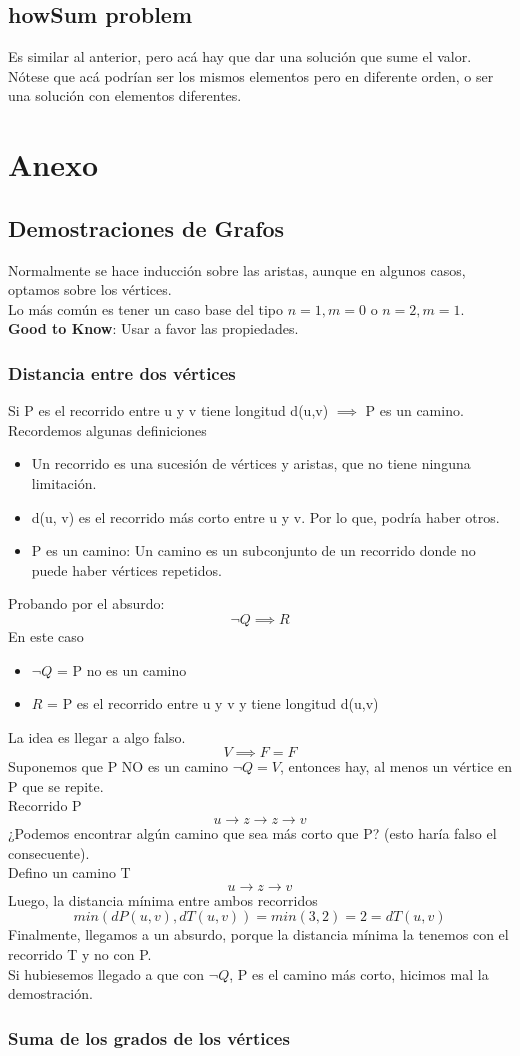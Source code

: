 \documentclass[10pt,a4paper]{article}
\begin{document}
\subsection*{howSum problem}
Es similar al anterior, pero acá hay que dar una solución que sume el valor. Nótese que acá podrían ser los mismos elementos pero en diferente orden, o ser una solución con elementos diferentes.
\section*{Anexo}
\subsection*{Demostraciones de Grafos}
Normalmente se hace inducción sobre las aristas, aunque en algunos casos, optamos sobre los vértices. \\
Lo más común es tener un caso base del tipo $n=1, m=0$ o $n=2, m=1$. \\
\textbf{Good to Know}: Usar a favor las propiedades.
\subsubsection*{Distancia entre dos vértices}
\label{subsubsec:distancia_demostracion}
Si P es el recorrido entre u y v tiene longitud d(u,v) $\implies$ P es un camino. \\
Recordemos algunas definiciones
\begin{itemize}
    \item Un recorrido es una sucesión de vértices y aristas, que no tiene ninguna limitación.
    \item d(u, v) es el recorrido más corto entre u y v. Por lo que, podría haber otros. 
    \item P es un camino: Un camino es un subconjunto de un recorrido donde no puede haber vértices repetidos.
\end{itemize}
Probando por el absurdo: 
\[\neg Q \implies R\]
En este caso
\begin{itemize}
    \item $\neg Q$ = P no es un camino
    \item $R$ = P es el recorrido entre u y v y tiene longitud d(u,v)
\end{itemize}
La idea es llegar a algo falso.  
\[V \implies F = F\]
Suponemos que P NO es un camino $\neg Q = V$, entonces hay, al menos un vértice en P que se repite.  \\
Recorrido P \[u \rightarrow z \rightarrow z \rightarrow v\]
¿Podemos encontrar algún camino que sea más corto que P? (esto haría falso el consecuente). \\
Defino un camino T \[u \rightarrow z \rightarrow v\] 
Luego, la distancia mínima entre ambos recorridos
\[min(dP(u,v), dT(u,v)) = min(3, 2) = 2 = dT(u,v)\]
Finalmente, llegamos a un absurdo, porque la distancia mínima la tenemos con el recorrido T y no con P. \\
Si hubiesemos llegado a que con $\neg Q$, P es el camino más corto, hicimos mal la demostración.
\subsubsection*{Suma de los grados de los vértices}
\label{subsubsec:suma_grados_vertices}
\end{document}
